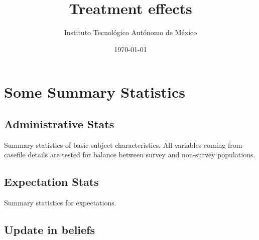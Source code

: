 \documentclass[12pt]{article}
\theoremstyle{named}
\newcommand{\folder}{./Effect}
\begin{document}
\title{Treatment effects}

\author{Instituto Tecnológico Autónomo de México}
\date{\today}
\maketitle


\hrulefill


\section{Some Summary Statistics}

\vspace{7mm}

\subsection*{Administrative Stats}

Summary statistics of basic subject characteristics. All variables coming from casefile details are tested for balance between survey and non-survey populations.

\begin{center}
\scriptsize{}
\end{center}


\pagebreak

\begin{center}
\scriptsize{}
\end{center}

\pagebreak

\begin{landscape}
\begin{center}
\scriptsize{}
\end{center}

\end{landscape}

\subsection*{Expectation Stats}

Summary statistics for expectations.

\begin{center}
\scriptsize{}
\end{center}

\pagebreak

\subsection*{Update in beliefs}
\end{document}
